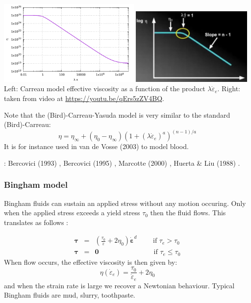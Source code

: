 \begin{center}
\includegraphics[width=7cm]{images/rheology/carreau/carreau.pdf}
\includegraphics[width=6cm]{images/rheology/carreau/carreau1}\\
{\captionfont Left: Carreau model effective viscosity as a function of 
the product $\lambda \dot{\varepsilon}_{e}$. Right: taken from 
video at \url{https://youtu.be/qErs5zZV4BQ}.}
\end{center}

Note that the (Bird)-Carreau-Yasuda model \cite{osru14} is very similar to the standard (Bird)-Carreau:
\begin{equation}
\eta = \eta_\infty + (\eta_0-\eta_\infty) \left(1 + (\lambda \dot{\varepsilon}_{e})^a \right)^{(n-1)/a}
\end{equation}
It is for instance used in van de Vosse \etal (2003) \cite{vadv03} to model blood.

\Literature: Bercovici (1993) \cite{berc93}, Bercovici (1995) \cite{berc95},
Marcotte (2000) \cite{marc00}, Huerta \& Liu (1988) \cite{huli88}.

\subsubsection{Bingham model} \label{sec:bingham}

Bingham fluids can sustain an applied stress without any motion occuring. Only when the applied stress exceeds
a yield stress $\tau_0$ then the fluid flows. This translates as follows \cite{reddybook2}:

\begin{eqnarray}
{\bm \tau} &=& \left(  \frac{\tau_0}{\dot{\varepsilon}} + 2 \eta_0  \right)\dot{\bm \varepsilon}^d \qquad 
\text{ if } {\tau}_{e}>\tau_0 \\
{\bm \tau} &=& {\bm 0} \qquad\qquad\qquad\qquad  \text{if } \tau_{e} \leq \tau_0 
\end{eqnarray}
When flow occurs, the effective viscosity is then given by:
\begin{equation}
\eta(\dot{\varepsilon}_e) = \frac{\tau_0}{\dot{\varepsilon}_e} + 2 \eta_0 
\end{equation}
and when the strain rate is large we recover a Newtonian behaviour.
Typical Bingham fluids are mud, slurry, toothpaste.  

